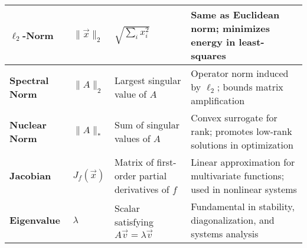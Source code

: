 \documentclass[12pt]{article}
\begin{document}
\begin{longtable}{|>{\bfseries}m{2.5cm}|m{2.5cm}|p{4.6cm}|p{7cm}|}
		\hline
		$\ell_2$-Norm & $\lVert\vec{x}\rVert_2$ & $\sqrt{\sum_i x_i^2}$ & Same as Euclidean
		norm; minimizes energy in least-squares \\
		\hline
		Spectral Norm & $\lVert A\rVert_2$ & Largest singular value of $A$ & Operator norm
		induced by $\ell_2$; bounds matrix amplification \\
		\hline
		Nuclear Norm & $\lVert A\rVert_*$ & Sum of singular values of $A$ & Convex surrogate
		for rank; promotes low-rank solutions in optimization \\
		\hline
		Jacobian & $J_f(\vec{x})$ & Matrix of first-order partial derivatives of $f$ & Linear
		approximation for multivariate functions; used in nonlinear systems \\
		\hline
		Eigenvalue & $\lambda$ & Scalar satisfying $A\vec{v} = \lambda\vec{v}$ & Fundamental in
		stability, diagonalization, and systems analysis \\

\end{longtable}
\end{document}
